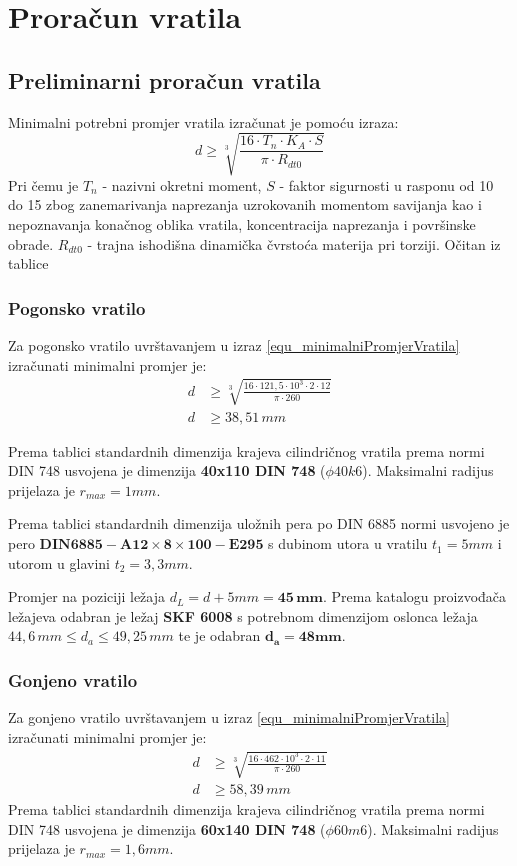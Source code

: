 \documentclass[11pt,a4paper,openright,twoside]{report}
\begin{document}
\section{Proračun vratila}
\subsection{Preliminarni proračun vratila}
Minimalni potrebni promjer vratila izračunat je pomoću izraza:
\begin{equation}
d\geq \sqrt[3]{\frac{16 \cdot T_n \cdot K_A \cdot S}{\pi \cdot R_{dt0}}}\label{equ_minimalniPromjerVratila}
\end{equation}
Pri čemu je $T_n$ - nazivni okretni moment,
$S$ - faktor sigurnosti u rasponu od 10 do 15 zbog zanemarivanja naprezanja uzrokovanih momentom savijanja kao i nepoznavanja konačnog oblika vratila, koncentracija naprezanja i površinske obrade.
$R_{dt0}$ - trajna ishodišna dinamička čvrstoća materija pri torziji. Očitan iz tablice \cite{krivzan1998osnove}

\subsubsection{Pogonsko vratilo}
Za pogonsko vratilo uvrštavanjem u izraz \eqref{equ_minimalniPromjerVratila} izračunati minimalni promjer je:
\begin{align*}
d&\geq \sqrt[3]{\frac{16 \cdot 121,5 \cdot 10^3 \cdot 2 \cdot 12}{\pi \cdot 260}}\\
d&\geq 38,51 \,mm
\end{align*}

Prema tablici\cite{potrebniMaterijali} standardnih dimenzija krajeva cilindričnog vratila prema normi DIN 748 usvojena je dimenzija \textbf{40x110 DIN 748} ($\phi40k6$).
Maksimalni radijus prijelaza je $r_{max}=1 mm$.

Prema tablici standardnih dimenzija uložnih pera\cite{potrebniMaterijali} po DIN 6885 normi usvojeno je pero $\mathbf{DIN6885-A 12 \times 8 \times 100-E295}$ s dubinom utora u vratilu $t_1=5mm$ i utorom u glavini $t_2=3,3mm$.

Promjer na poziciji ležaja $d_L=d+5mm= \mathbf{45 \,mm}$.
Prema katalogu proizvođača ležajeva\cite{skf} odabran je ležaj \textbf{SKF 6008} s potrebnom dimenzijom oslonca ležaja $44,6 \, mm \leq d_a \leq 49,25 \, mm$ te je odabran $\mathbf{d_a=48mm}$.

\subsubsection{Gonjeno vratilo}
Za gonjeno vratilo uvrštavanjem u izraz \eqref{equ_minimalniPromjerVratila} izračunati minimalni promjer je:
\begin{align*}
d&\geq \sqrt[3]{\frac{16 \cdot 462 \cdot 10^3 \cdot 2 \cdot 11}{\pi \cdot 260}}\\
d&\geq 58,39 \,mm
\end{align*}
Prema tablici\cite{potrebniMaterijali} standardnih dimenzija krajeva cilindričnog vratila prema normi DIN 748 usvojena je dimenzija \textbf{60x140 DIN 748} ($\phi60m6$).
Maksimalni radijus prijelaza je $r_{max}=1,6 mm$.
\end{document}
